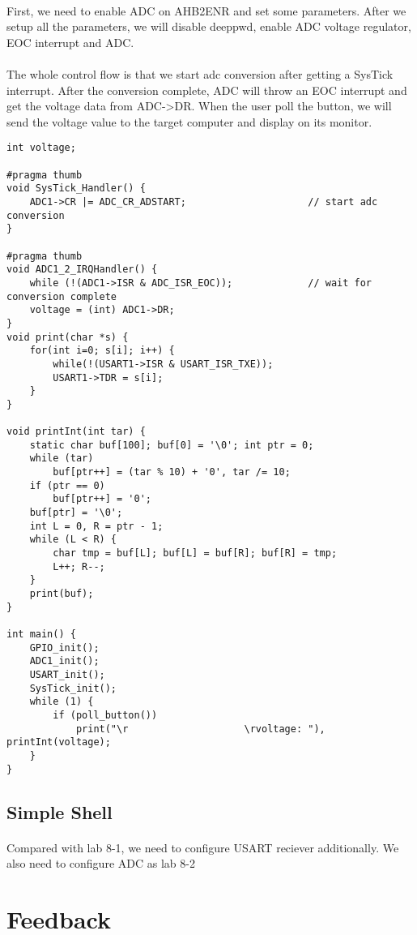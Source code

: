 \paragraph{}
First, we need to enable ADC on AHB2ENR and set some parameters. After we setup all the parameters, we will disable deeppwd, enable ADC voltage regulator, EOC interrupt and ADC.
\paragraph{}
The whole control flow is that we start adc conversion after getting a SysTick interrupt. After the conversion complete, ADC will throw an EOC interrupt and get the voltage data from ADC->DR. When the user poll the button, we will send the voltage value to the target computer and display on its monitor.
\begin{lstlisting}
int voltage;

#pragma thumb
void SysTick_Handler() {
    ADC1->CR |= ADC_CR_ADSTART;                     // start adc conversion
}

#pragma thumb
void ADC1_2_IRQHandler() {
	while (!(ADC1->ISR & ADC_ISR_EOC));             // wait for conversion complete
	voltage = (int) ADC1->DR;
}
void print(char *s) {
    for(int i=0; s[i]; i++) {
        while(!(USART1->ISR & USART_ISR_TXE));
        USART1->TDR = s[i];
    }
}

void printInt(int tar) {
    static char buf[100]; buf[0] = '\0'; int ptr = 0;
    while (tar)
        buf[ptr++] = (tar % 10) + '0', tar /= 10;
    if (ptr == 0)
        buf[ptr++] = '0';
    buf[ptr] = '\0';
    int L = 0, R = ptr - 1;
    while (L < R) {
        char tmp = buf[L]; buf[L] = buf[R]; buf[R] = tmp;
        L++; R--;
    }
    print(buf);
}

int main() {
    GPIO_init();
    ADC1_init();
    USART_init();
    SysTick_init();
    while (1) {
        if (poll_button())
            print("\r                    \rvoltage: "), printInt(voltage);
    }
}
\end{lstlisting}

\subsection{Simple Shell}
\paragraph{}
Compared with lab 8-1, we need to configure USART reciever additionally.
We also need to configure ADC as lab 8-2
\section{Feedback}
\paragraph{}

